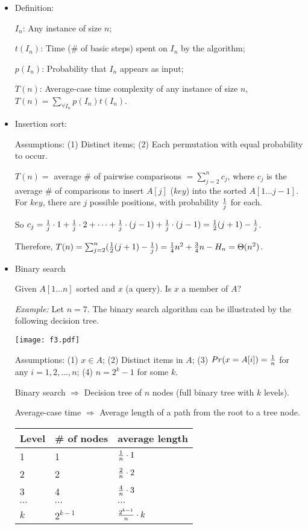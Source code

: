 \documentclass{article}
\begin{document}
\begin{itemize}

\item Definition:

$I_n$: Any instance of size $n$;

$t(I_n)$: Time (\# of basic steps) spent on $I_n$ by the algorithm;

$p(I_n)$: Probability that $I_n$ appears as input;

$T(n)$: Average-case time complexity of any instance of size $n$,
$T(n)=\sum_{\forall I_n}p(I_n)t(I_n)$.

\item Insertion sort:

Assumptions: (1) Distinct items; (2) Each permutation with equal
probability to occur.

$T(n)=$ average \# of pairwise comparisons $=\sum_{j=2}^n c_j$, where
$c_j$ is the average \# of comparisons to insert $A[j]$ ($key$) into the sorted
$A[1\ldots j-1]$. For $key$, there are $j$ possible positions, with 
probability ${1\over j}$ for each.

So $c_j={1\over j}\cdot 1+{1\over j}\cdot 2+\cdots+{1\over j}\cdot (j-1)
+{1\over j}\cdot (j-1)={1\over2}(j+1)-{1\over j}$.

Therefore, $T(n)=\sum_{j=2}^n({1\over2}(j+1)-{1\over j})
={1\over4}n^2+{3\over4}n-H_n=\Theta(n^2)$.

\item Binary search

Given $A[1\ldots n]$ sorted and $x$ (a query). Is $x$ a member of $A$?

{\em Example:} Let $n=7$. The binary search algorithm can be illustrated
by the following decision tree.

\vskip 0.25cm
\begin{center}
\texttt{[image: f3.pdf]}
\end{center}

Assumptions: (1) $x\in A$; (2) Distinct items in $A$; (3)
$Pr(x=A[i])={1\over n}$ for any $i=1,2,\ldots,n$; (4) $n=2^k-1$ for some $k$.

Binary search $\Rightarrow$ Decision tree of $n$ nodes (full binary tree
with $k$ levels).

Average-case time $\Rightarrow$ Average length of a path from the root to
a tree node.

\begin{center}
\begin{tabular}{l|l|l}
Level & \# of nodes & average length\\ \hline
1 & 1 & ${1\over n}\cdot 1$\\
2 & 2 & ${2\over n}\cdot 2$\\
3 & 4 & ${4\over n}\cdot 3$\\
$\cdots$ & $\cdots$ & $\cdots$\\
$k$ & $2^{k-1}$ & ${2^{k-1}\over n}\cdot k$
\end{tabular}
\end{center}


\end{itemize}
\end{document}

